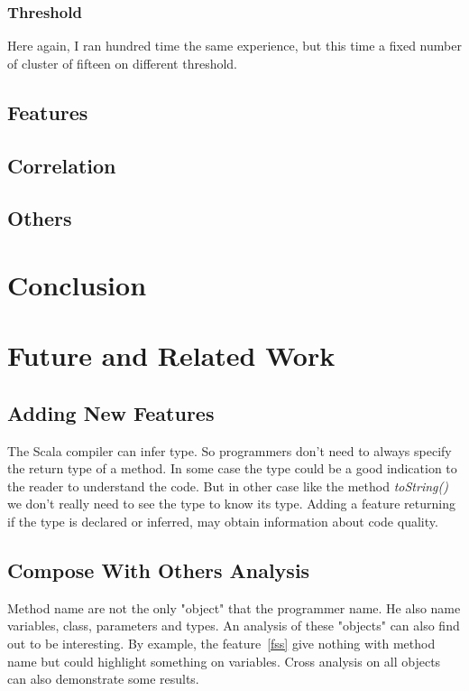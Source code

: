 \documentclass[12pt]{article}
\begin{document}
\subsubsection{Threshold}
\label{threshold}
Here again, I ran hundred time the same experience, but this time a fixed number of cluster of fifteen on different threshold.
\subsection {Features}

\subsection {Correlation}

\subsection {Others} 

\section {Conclusion} 

\section {Future and Related Work}
\subsection{Adding New Features}
The Scala compiler can infer type. So programmers don't need to always specify the return type of a method. In some case the type could be a good indication to the reader to understand the code. But in other case like the method \textit{toString()} we don't really need to see the type to know its type. Adding a feature returning if the type is declared or inferred, may obtain information about code quality.
\subsection{Compose With Others Analysis}
Method name are not the only "object" that the programmer name. He also name variables, class, parameters and types. An analysis of these "objects" can also find out to be interesting. By example, the feature~\ref{fss} give nothing with method name but could highlight something on variables. Cross analysis on all objects can also demonstrate some results.


\newpage



\end{document}

